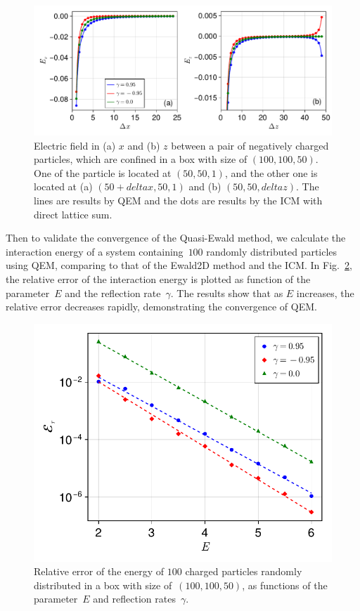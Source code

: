 \begin{figure}[htb]
    \centering
    \includegraphics[width = \linewidth]{figs/E_xyz.pdf}
    \caption{
        Electric field in (a) $x$ and (b) $z$ between a pair of negatively charged particles, which are confined in a box with size of $(100, 100, 50)$.
        One of the particle is located at $(50, 50, 1)$, and the other one is located at (a) $(50 + delta x, 50, 1)$ and (b) $(50, 50, delta z)$.
        The lines are results by QEM and the dots are results by the ICM with direct lattice sum.
    }
    \label{fig:E_xyz}
\end{figure}

Then to validate the convergence of the Quasi-Ewald method, we calculate the interaction energy of a system containing~$100$ randomly distributed particles using QEM, comparing to that of the Ewald2D method and the ICM.
In Fig.~\ref{fig:Error_E}, the relative error of the interaction energy is plotted as function of the parameter~$E$ and the reflection rate~$\gamma$.
The results show that as $E$ increases, the relative error decreases rapidly, demonstrating the convergence of QEM.

\begin{figure}[htb]
    \centering
    \includegraphics[width = 0.625\linewidth]{figs/e_total.pdf}
    \caption{
        Relative error of the energy of $100$ charged particles randomly distributed in a box with size of~$(100, 100, 50)$, as functions of the parameter~$E$ and reflection rates~$\gamma$.
    }
    \label{fig:Error_E}
\end{figure}


